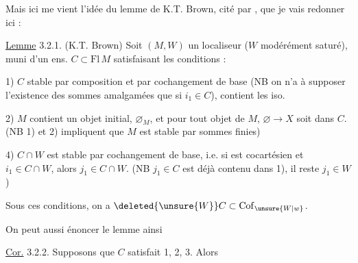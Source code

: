 
Mais ici me vient l'idée du lemme de K.T. Brown, cité par , que je vais redonner ici :

\uline{Lemme} 3.2.1. (K.T. Brown) Soit $(M,W)$ un localiseur ($W$ modérément saturé), muni d'un ens. $C\subset\mathrm{Fl}\,M$ satisfaisant les conditions :

1) $C$ stable par composition et par cochangement de base (NB on n'a  à supposer l'existence des sommes amalgamées
que si $i_1\in C$), contient les iso.

2) $M$ contient un objet initial, $\varnothing_M$, et pour tout objet  de $M$, $\varnothing\longrightarrow X$ soit dans $C$. (NB 1) et 2) impliquent que $M$ est stable par sommes finies)


4) $C\cap W$ est stable par cochangement de base, i.e. si
est cocartésien et  $i_1\in C\cap W$, alors $j_1\in C\cap W$. (NB $j_1\in C$ est déjà contenu dans 1), il reste  $j_1\in W$)

Sous ces conditions, on a $\deleted{\unsure{W}}C\subset\mathrm{Cof}_{\unsure{W|w}}$.

On peut aussi énoncer le lemme ainsi

\uline{Cor.} 3.2.2. Supposons que $C$ satisfait 1, 2, 3. Alors 
